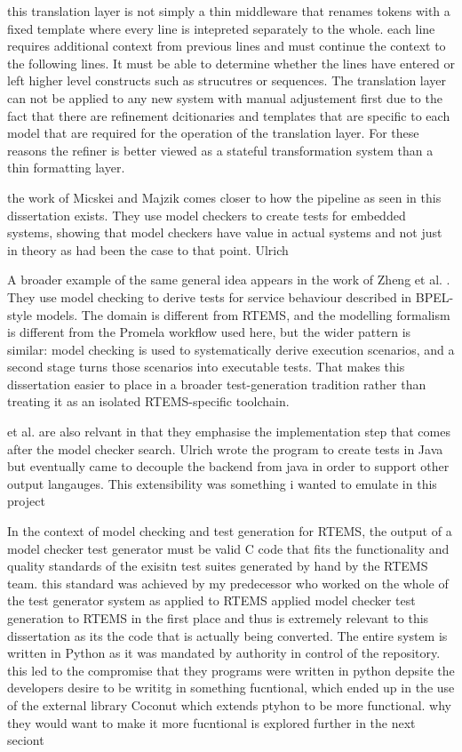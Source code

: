  this translation layer is not simply a thin middleware that renames tokens with a fixed template where every line is intepreted separately to the whole. each line requires additional context from previous lines and must continue the context to the following lines. It must be able to determine whether the lines have entered or left higher level constructs such as strucutres or sequences. The translation layer can not be applied to any new system with manual adjustement first due to the fact that there are refinement dcitionaries and templates that are specific to each model that are required for the operation of the translation layer. For these reasons the refiner is better viewed as a stateful transformation system than a thin formatting layer.
 




the work of  Micskei
and Majzik \citep{micskei2006modelbased} comes closer to how the pipeline as seen in this dissertation exists. They use model checkers to create tests for embedded systems, showing that model checkers have value in actual systems and not just in theory as had been the case to that point.
Ulrich


A broader example of the same general idea appears in the work of Zheng et al. \citep{zheng2007model}. They use model checking to derive tests for service behaviour described in BPEL-style models. The domain is different from RTEMS, and the modelling formalism is different from the Promela workflow used here, but the wider pattern is similar: model checking is used to systematically derive execution scenarios, and a second stage turns those scenarios into executable tests. That makes this dissertation easier to place in a broader test-generation tradition rather than treating it as an isolated RTEMS-specific toolchain.

et al. \citep{ulrich2010scenarios} are also relvant in that they emphasise the implementation step that comes after the model checker search. Ulrich wrote the program to create tests in Java but eventually came to decouple the backend from java in order to support other output langauges. This extensibility was something i wanted to emulate in this project

In the context of model checking and test generation for RTEMS, the output of a model checker test generator must be valid C code that fits the functionality and quality standards of the exisitn test suites generated by hand by the RTEMS team. this standard was achieved by my predecessor who worked on the whole of the test generator system as applied to RTEMS \citep{jaskuc2022barrier} applied model checker test generation to RTEMS in the first place and thus is extremely relevant to this dissertation as its the code that is actually being converted. The entire system is written in Python as it was mandated by authority in control of the repository. this led to the compromise that they programs were written in python depsite the developers desire to be writitg in something fucntional, which ended up in the use of the external library Coconut which extends ptyhon to be more functional. why they would want to make it more fucntional is explored further in the next seciont


